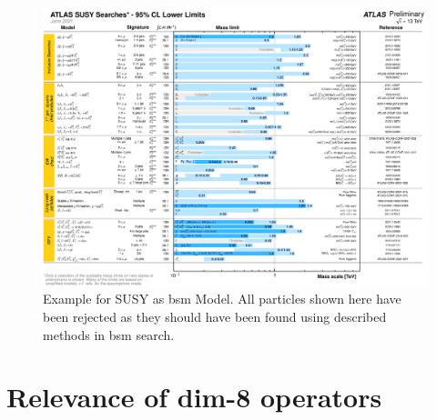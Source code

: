 \documentclass[../Bachelorarbeit.tex]{subfiles}
\begin{document}
\captionsetup[figure]{list=no}
\begin{figure}[h]
    \centering
    \includegraphics[width=\textwidth]{images/fig_23_ATLAS_SUSY.png}
    \caption{Example for SUSY as \acrshort{bsm} Model. All particles shown here have been rejected as they should have been found using described methods in \acrshort{bsm} search.  \cite{.07.06.2021}}
    \label{fig:ATLAS_SUSY}
\end{figure}
\clearpage
\section{Relevance of dim-8 operators}
\label{sec:signif_dim8}
\end{document}
